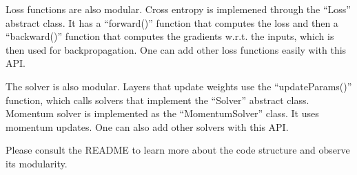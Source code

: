 \documentclass[paper=a4, fontsize=11pt]{scrartcl}
\begin{document}
Loss functions are also modular.  Cross entropy is implemened through the ``Loss'' abstract class.  It has a ``forward()'' function that computes the loss and then a ``backward()'' function that computes the gradients w.r.t. the inputs, which is then used for backpropagation.  One can add other loss functions easily with this API.

The solver is also modular.  Layers that update weights use the ``updateParams()'' function, which calls solvers that implement the ``Solver'' abstract class.  Momentum solver is implemented as the ``MomentumSolver'' class.  It uses momentum updates.  One can also add other solvers with this API.

Please consult the README to learn more about the code structure and observe its modularity.
\end{document}
